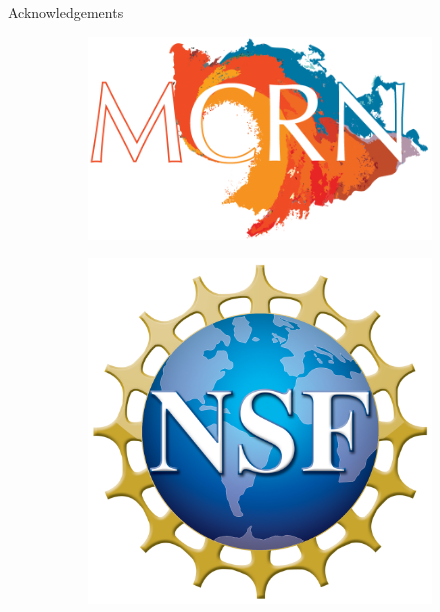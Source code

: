 \documentclass[aspectratio=169]{beamer}
\begin{document}

\begin{frame}{Acknowledgements}
\vfill
\begin{figure}
     \centering
     \begin{subfigure}[b]{0.35\textwidth}
         \centering
         \includegraphics[width=\textwidth]{figures/mcrn_logo.png}
     \end{subfigure}
     \hspace*{2cm}
     \begin{subfigure}[b]{0.23\textwidth}
         \centering
         \includegraphics[width=\textwidth]{figures/nsf_logo.png}

\end{subfigure}
\end{figure}
\end{frame}
\end{document}
